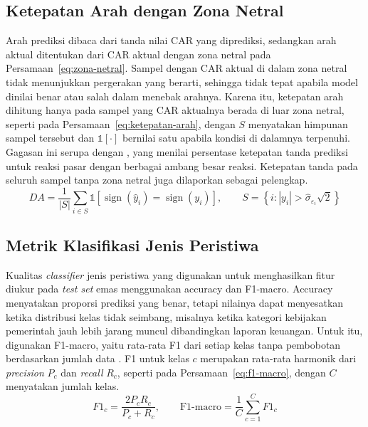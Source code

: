 \subsection{Ketepatan Arah dengan Zona Netral}

Arah prediksi dibaca dari tanda nilai CAR yang diprediksi, sedangkan arah aktual ditentukan dari CAR aktual dengan zona netral pada Persamaan~\ref{eq:zona-netral}. Sampel dengan CAR aktual di dalam zona netral tidak menunjukkan pergerakan yang berarti, sehingga tidak tepat apabila model dinilai benar atau salah dalam menebak arahnya. Karena itu, ketepatan arah dihitung hanya pada sampel yang CAR aktualnya berada di luar zona netral, seperti pada Persamaan~\ref{eq:ketepatan-arah}, dengan $S$ menyatakan himpunan sampel tersebut dan $\mathbb{1}[\cdot]$ bernilai satu apabila kondisi di dalamnya terpenuhi. Gagasan ini serupa dengan \textcite{amelzadeh2020}, yang menilai persentase ketepatan tanda prediksi untuk reaksi pasar dengan berbagai ambang besar reaksi. Ketepatan tanda pada seluruh sampel tanpa zona netral juga dilaporkan sebagai pelengkap.
\begin{equation}
DA = \frac{1}{|S|} \sum_{i \in S} \mathbb{1}\left[ \operatorname{sign}(\hat{y}_i) = \operatorname{sign}(y_i) \right], \qquad S = \left\{ i : |y_i| > \hat{\sigma}_{\varepsilon_i} \sqrt{2} \right\}
\label{eq:ketepatan-arah}
\end{equation}

\subsection{Metrik Klasifikasi Jenis Peristiwa}

Kualitas \emph{classifier} jenis peristiwa yang digunakan untuk menghasilkan fitur diukur pada \emph{test set} emas menggunakan accuracy dan F1-macro. Accuracy menyatakan proporsi prediksi yang benar, tetapi nilainya dapat menyesatkan ketika distribusi kelas tidak seimbang, misalnya ketika kategori kebijakan pemerintah jauh lebih jarang muncul dibandingkan laporan keuangan. Untuk itu, digunakan F1-macro, yaitu rata-rata F1 dari setiap kelas tanpa pembobotan berdasarkan jumlah data \autocite{sokolova2009}. F1 untuk kelas $c$ merupakan rata-rata harmonik dari \emph{precision} $P_c$ dan \emph{recall} $R_c$, seperti pada Persamaan~\ref{eq:f1-macro}, dengan $C$ menyatakan jumlah kelas.
\begin{equation}
F1_c = \frac{2 P_c R_c}{P_c + R_c}, \qquad \text{F1-macro} = \frac{1}{C} \sum_{c=1}^{C} F1_c
\label{eq:f1-macro}
\end{equation}

